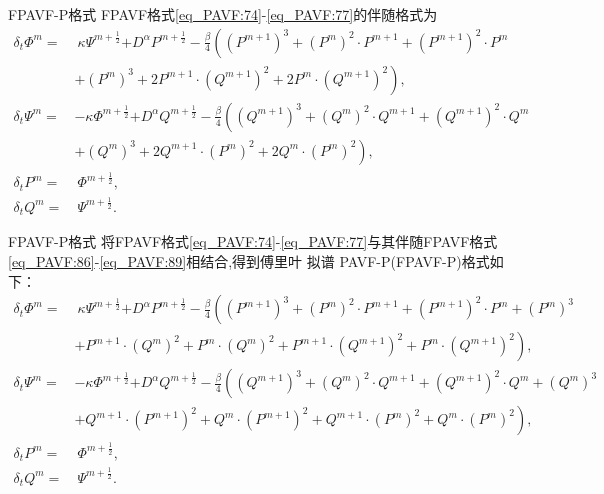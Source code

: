 \documentclass[aspectratio=169]{beamer}
\numberwithin{theorem}{section} %
\numberwithin{equation}{section}%
\numberwithin{figure}{section}%
\numberwithin{table}{section}%
\begin{document}
\begin{frame}{FPAVF-P格式}
	FPAVF格式\eqref{eq_PAVF:74}-\eqref{eq_PAVF:77}的伴随格式为
	{\small\begin{align}
	\delta_{t} \varPhi^{m}=&~\kappa \Psi^{m+\frac{1}{2}}{+D^{\alpha} P^{m+\frac{1}{2}}}-\frac{\beta}{4}\left( (P^{m+1})^3+ (P^{m})^{2}\cdot P^{m+1}+(P^{m+1})^{2}\cdot P^{m}\right.\nonumber\\
		&\left.+ (P^{m})^{3}+2 P^{m+1}\cdot (Q^{m+1})^{2}+2 P^{m}\cdot (Q^{m+1})^{2}\right),\label{eq_PAVF:86}\\
	\delta_{t} \Psi^{m}=&-\kappa \varPhi^{m+\frac{1}{2}}{+D^{\alpha} Q^{m+\frac{1}{2}}}-\frac{\beta}{4}\left( (Q^{m+1})^3+ (Q^{m})^{2}\cdot Q^{m+1}+ (Q^{m+1})^{2}\cdot Q^{m}\right.\nonumber\\
		&\left.+ (Q^{m})^{3}+2 Q^{m+1}\cdot (P^{m})^{2}+2 Q^{m}\cdot (P^{m})^{2}\right),\label{eq_PAVF:87}\\
	\delta_{t} P^{m}=&~\varPhi^{m+\frac{1}{2}},\label{eq_PAVF:88}\\
	\delta_{t} Q^{m}=&~\Psi^{m+\frac{1}{2}}.\label{eq_PAVF:89}
	\end{align}}
	
\end{frame}
\begin{frame}{FPAVF-P格式}
	将FPAVF格式\eqref{eq_PAVF:74}-\eqref{eq_PAVF:77}与其伴随FPAVF格式\eqref{eq_PAVF:86}-\eqref{eq_PAVF:89}相结合,得到傅里叶 拟谱 PAVF-P(FPAVF-P)格式如下：
	{\small\color{purple}\begin{align}
	\delta_{t} \varPhi^{m}=&~\kappa \Psi^{m+\frac{1}{2}}{+D^{\alpha} P^{m+\frac{1}{2}}}-\frac{\beta}{4}\left((P^{m+1})^3+(P^{m})^{2}\cdot P^{m+1}+(P^{m+1})^{2}\cdot P^{m}+(P^{m})^{3}\right.\nonumber\\
		&\left.+P^{m+1}\cdot (Q^{m})^{2}+P^{m}\cdot (Q^{m})^{2}+P^{m+1}\cdot (Q^{m+1})^{2}+P^{m}\cdot (Q^{m+1})^{2}\right),\label{eq_PAVF:98}\\
	\delta_{t} \Psi^{m}=&-\kappa \varPhi^{m+\frac{1}{2}}{+D^{\alpha} Q^{m+\frac{1}{2}}}-\frac{\beta}{4}\left((Q^{m+1})^3+(Q^{m})^{2}\cdot Q^{m+1}+(Q^{m+1})^{2}\cdot Q^{m}+(Q^{m})^{3}\right.\nonumber\\
		&\left.+Q^{m+1}\cdot (P^{m+1})^{2}+Q^{m}\cdot (P^{m+1})^{2}+Q^{m+1}\cdot (P^{m})^{2}+Q^{m}\cdot (P^{m})^{2}\right),\label{eq_PAVF:99}\\
	\delta_{t} P^{m}=&~\varPhi^{m+\frac{1}{2}},\label{eq_PAVF:100}\\
	\delta_{t} Q^{m}=&~\Psi^{m+\frac{1}{2}}.\label{eq_PAVF:101}
	\end{align}}
	
\end{frame}
\end{document}
